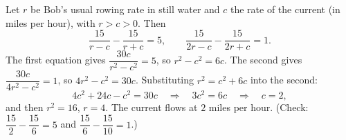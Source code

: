 Let $r$ be Bob's usual rowing rate in still water and $c$ the rate of the current (in miles per hour), with $r>c>0$. Then
\[\dfrac{15}{r-c}-\dfrac{15}{r+c}=5,\qquad\dfrac{15}{2r-c}-\dfrac{15}{2r+c}=1.\]
The first equation gives $\dfrac{30c}{r^2-c^2}=5$, so $r^2-c^2=6c$. The second gives $\dfrac{30c}{4r^2-c^2}=1$, so $4r^2-c^2=30c$. Substituting $r^2=c^2+6c$ into the second:
\[4c^2+24c-c^2=30c\quad\Longrightarrow\quad3c^2=6c\quad\Longrightarrow\quad c=2,\]
and then $r^2=16$, $r=4$. The current flows at $\boxed{2}$ miles per hour. (Check: $\dfrac{15}{2}-\dfrac{15}{6}=5$ and $\dfrac{15}{6}-\dfrac{15}{10}=1$.)
